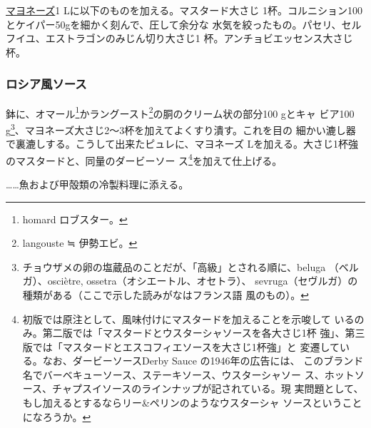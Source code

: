\begin{recette}
\protect\hyperlink{mayonnaise}{マヨネーズ}1
Lに以下のものを加える。マスタード大さじ
1\undemi{}杯。コルニション100とケイパー50gを細かく刻んで、圧して余分な
水気を絞ったもの。パセリ、セルフイユ、エストラゴンのみじん切り大さじ1
杯。アンチョビエッセンス大さじ\undemi{}杯。

\hypertarget{sauce-russe-froide}{%
\subsubsection{ロシア風ソース}\label{sauce-russe-froide}}



鉢に、オマール\footnote{homard ロブスター。}かラングースト\footnote{langouste
  ≒ 伊勢エビ。}の胴のクリーム状の部分100 gとキャ ビア100 g\footnote{チョウザメの卵の塩蔵品のことだが、「高級」とされる順に、beluga
  （ベルガ）、osciètre, ossetra（オシエートル、オセトラ）、
  sevruga（セヴルガ）の種類がある（ここで示した読みがなはフランス語
  風のもの）。}、マヨネーズ大さじ2〜3杯を加えてよくすり潰す。これを目の
細かい漉し器で裏漉しする。こうして出来たピュレに、マヨネーズ
\troisquarts{} Lを加える。大さじ1杯強のマスタードと、同量のダービーソー
ス\footnote{初版では原注として、風味付けにマスタードを加えることを示唆して
  いるのみ。第二版では「マスタードとウスターシャソースを各大さじ1杯
  強」、第三版では「マスタードとエスコフィエソースを大さじ1杯強」と
  変遷している。なお、ダービーソースDerby Sauce の1946年の広告には、
  このブランド名でバーベキューソース、ステーキソース、ウスターシャソー
  ス、ホットソース、チャプスイソースのラインナップが記されている。現
  実問題として、もし加えるとするならリー\&ペリンのようなウスターシャ
  ソースということになろうか。}を加えて仕上げる。

\ldots{}\ldots{}魚および甲殻類の冷製料理に添える。

\hypertarget{sauce-tartare}{%
}
\end{recette}
